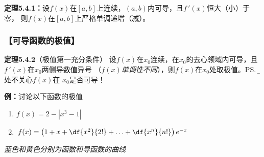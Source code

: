 {\bf 定理5.4.1：}设$f(x)$在$[a,b]$上连续，$(a,b)$内可导，且$f\,'(x)$恒大（小）于零，
则$f(x)$在$[a,b]$上严格单调递增（减）。



\subsubsection{【可导函数的极值】}

{\bf 定理5.4.2}（极值第一充分条件）
设$f(x)$在$x_0$连续，在$x_0$的去心领域内可导，且$f\,'(x)$在$x_0$两侧导数值异号
（{\it $f(x)$单调性不同}），则$f(x)$在$x_0$处取极值。\ps{\b 此处不关心$f(x)$在
$x_0$是否可导！}

{\bf 例：}讨论以下函数的极值
\begin{enumerate}[(1)]
  \setlength{\itemindent}{1cm}
  \item $f(x)=2-|x^3-1|$
  \item $f(x)=\left(1+x+\df{x^2}{2!}+\ldots+\df{x^n}{n!}\right)e^{-x}$ 
\end{enumerate}

\begin{center}
	\quad
	
	{\it 蓝色和黄色分别为函数和导函数的曲线}
\end{center}

